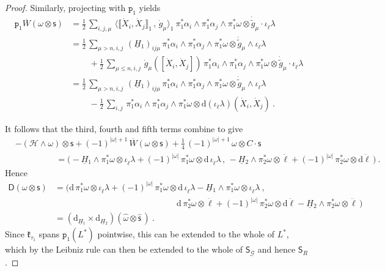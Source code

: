 \documentclass[a4paper, reqno, 11pt]{amsart}
\numberwithin{equation}{section}
\theoremstyle{definition}
\newcommand{\ip}[1]{\langle #1 \rangle}
\newcommand{\red}[1]{\underline{#1}}
\newcommand{\frk}[1]{\mathfrak{#1}}
\newcommand{\de}{\mathrm{d}}
\newcommand{\rmp}{\mathtt{p}}
\newcommand{\cH}{{\mathcal H}}
\newcommand{\ccG}{{\mathscr G}}
\newcommand{\sfD}{{\mathsf{D}}}
\newcommand{\sfS}{{\mathsf{S}}}
\newcommand{\sfs}{{\mathsf{s}}}
\theoremstyle{remark}
\begin{document}
\begin{proof}
Similarly, projecting with $\rmp_1$ yields
\begin{align}
    \rmp_1 \overline{W}(\omega \otimes \sfs) 
    &= \frac 12 \, \sum_{i,j,\mu}\, \ip{\llbracket \dot X_i, \dot X_j \rrbracket_1\,,\, \dot g_\mu}_1 \ \pi_1^*\alpha_i \wedge \pi_1^*\alpha_j \wedge \pi_1^*\omega \otimes \dot{\tilde g}_\mu \cdot \iota_{\dot\ell} \lambda \\[4pt]
    &= \frac 12 \, \sum_{\mu>n,i,j}\, (\red H{}_1)_{ij\mu}\, \pi_1^*\alpha_i \wedge \pi_1^*\alpha_j \wedge \pi_1^*\omega \otimes \dot{\tilde g}_\mu \wedge \iota_{\dot\ell} \lambda \\
    & \qquad \, + \frac 12 \, \sum_{\mu \leqslant n,i,j}\, \dot g_\mu([\dot X_i,\dot X_j])\, \pi_1^*\alpha_i \wedge \pi_1^*\alpha_j \wedge \pi_1^*\omega \otimes \dot{\tilde g}_\mu \cdot \iota_{\dot\ell}\lambda \\[4pt]
    &= \frac 12 \, \sum_{\mu>n,i,j}\, (\red H{}_1)_{ij\mu}\, \pi_1^*\alpha_i \wedge \pi_1^*\alpha_j \wedge \pi_1^*\omega \otimes \dot{\tilde g}_\mu \wedge \iota_{\dot\ell} \lambda \\
    & \qquad \, - \frac 12 \, \sum_{i,j}\, \pi_1^*\alpha_i \wedge \pi_1^*\alpha_j \wedge \pi_1^*\omega \otimes \de(\iota_{\dot\ell}\lambda)(\dot X_i,\dot X_j) \ . 
\end{align}

It follows that the third, fourth and fifth terms combine to give
\begin{equation}
\begin{aligned}
    &-(\cH \wedge \omega) \otimes \sfs + (-1)^{|\omega|+1}\, \overline{W}(\omega \otimes \sfs) +\tfrac 14\, (-1)^{|\omega|+1} \, \omega \otimes C\cdot\sfs  \\[4pt]
    & \hspace{2cm} = \big(-\red H{}_1\wedge \pi_1^*\omega \otimes \iota_{\dot\ell}\lambda +(-1)^{|\omega|}\, \pi_1^*\omega \otimes \de\, \iota_{\dot\ell}\lambda\,,\, -\red H{}_2 \wedge \pi_2^*\omega \otimes \ddot\ell + (-1)^{|\omega|}\,\pi_2^*\omega \otimes \de \ddot\ell\,\big) \ .
\end{aligned}
\end{equation}
Hence
\begin{equation}
\begin{aligned}
    \sfD(\omega \otimes \sfs) &= \big(\de\, \pi_1^*\omega \otimes \iota_{\dot\ell}\lambda + (-1)^{|\omega|}\, \pi_1^*\omega \otimes \de\, \iota_{\dot\ell}\lambda - \red H{}_1 \wedge \pi_1^*\omega \otimes \iota_{\dot\ell}\lambda\ ,\\ 
    &\hspace{6cm}\de\, \pi_2^*\omega \otimes \ddot\ell + (-1)^{|\omega|}\, \pi_2^*\omega\otimes \de \ddot\ell -\red H{}_2 \wedge \pi_2^*\omega \otimes \ddot\ell\,\big)\\[4pt]
    &= (\de_{\red H{}_1} \times \de_{\red H{}_2})( \widehat\omega \otimes \widehat\sfs\,) \ .
\end{aligned}
\end{equation}
Since $\frk{k}_{\tau_1}$ spans $\rmp_1(L^*)$ pointwise, this can be extended to the whole of $L^*$, which by the Leibniz rule can then be extended to the whole of $\sfS_\ccG$ and hence $\sfS_R$.
\end{proof}
\end{document}
